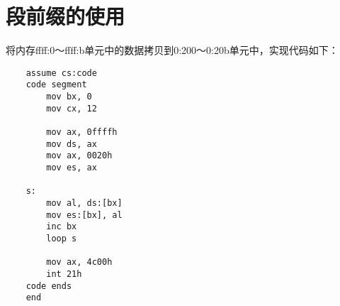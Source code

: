 \documentclass[a4paper,left=2.5cm,right=2.5cm,11pt]{article}
\begin{document}
\section{段前缀的使用}
	将内存ffff:0～ffff:b单元中的数据拷贝到0:200～0:20b单元中，实现代码如下：
	\begin{lstlisting}
	assume cs:code
	code segment
		mov bx, 0
		mov cx, 12

		mov ax, 0ffffh
		mov ds, ax
		mov ax, 0020h
		mov es, ax
		
	s:
		mov al, ds:[bx]
		mov es:[bx], al
		inc bx
		loop s

		mov ax, 4c00h
		int 21h
	code ends
	end
	\end{lstlisting}
\end{document}
